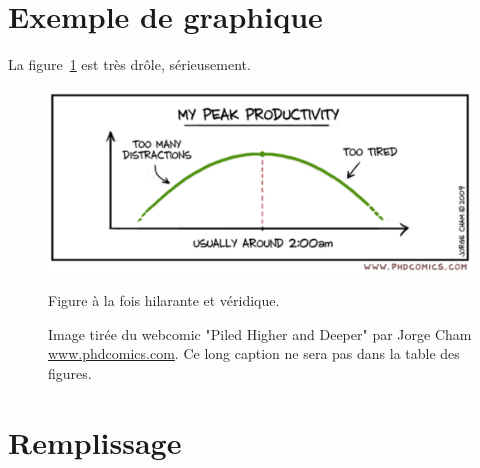 \section{Exemple de graphique}

La figure~\ref{fig:phdcomics} est très drôle, sérieusement.

\begin{figure}[htb]
    \begin{center}
        \includegraphics[width=0.8\columnwidth]{Figures/phd083109s.pdf} 
        \caption{Figure à la fois hilarante et véridique.}
        \label{fig:phdcomics}
        \vspace{-10pt}
        \caption*{ Image tirée du webcomic "Piled Higher and Deeper" par Jorge Cham
                   \href{www.phdcomics.com}{www.phdcomics.com}. 
                   Ce long caption ne sera pas dans la table des figures.
                 }
    \end{center}
\end{figure}

\section{Remplissage}
\kant[11-14]
